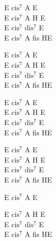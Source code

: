 \begin{chord}
    E $\mathrm{cis^7}$ A E\\
    E $\mathrm{cis^7}$ A H E\\
    E $\mathrm{cis^7}$ $\mathrm{dis^7}$ E\\
    E $\mathrm{cis^7}$ A fis HE

    E $\mathrm{cis^7}$ A E\\
    E $\mathrm{cis^7}$ A H E\\
    E $\mathrm{cis^7}$ $\mathrm{dis^7}$ E\\
    E $\mathrm{cis^7}$ A fis HE

    E $\mathrm{cis^7}$ A E\\
    E $\mathrm{cis^7}$ A H E\\
    E $\mathrm{cis^7}$ $\mathrm{dis^7}$ E\\
    E $\mathrm{cis^7}$ A fis HE

    E $\mathrm{cis^7}$ A E\\
    E $\mathrm{cis^7}$ A H E\\
    E $\mathrm{cis^7}$ $\mathrm{dis^7}$ E\\
    E $\mathrm{cis^7}$ A fis HE

    E $\mathrm{cis^7}$ A E

    E $\mathrm{cis^7}$ A H E\\
    E $\mathrm{cis^7}$ $\mathrm{dis^7}$ E\\
    E $\mathrm{cis^7}$ A fis HE
\end{chord}
